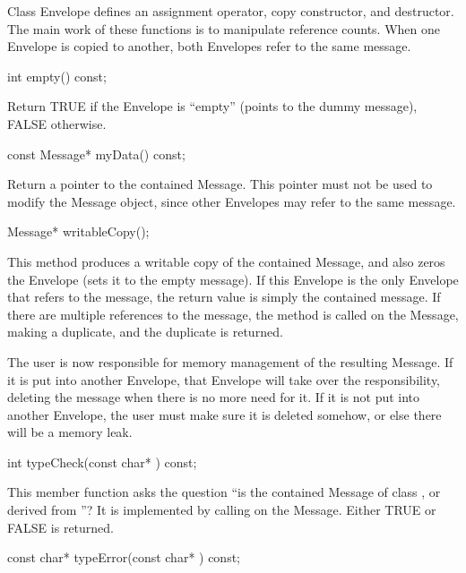 Class Envelope defines an assignment operator, copy constructor, and
destructor.  The main work of these functions is to manipulate reference
counts.  When one Envelope is copied to another, both Envelopes refer
to the same message.

\begin{example}
int empty() const;
\end{example}

Return TRUE if the Envelope is ``empty'' (points to the dummy message),
FALSE otherwise.

\begin{example}
const Message* myData() const;
\end{example}

Return a pointer to the contained Message.  This pointer must not be
used to modify the Message object, since other Envelopes may refer to
the same message.

\begin{example}
Message* writableCopy();
\end{example}

This method produces a writable copy of the contained Message, and
also zeros the Envelope (sets it to the empty message).  If this
Envelope is the only Envelope that refers to the message, the
return value is simply the contained message.  If there are multiple
references to the message, the  method is called on the
Message, making a duplicate, and the duplicate is returned.

The user is now responsible for memory management of the resulting
Message.  If it is put into another Envelope, that Envelope will
take over the responsibility, deleting the message when there is
no more need for it.  If it is not put into another Envelope, the
user must make sure it is deleted somehow, or else there will be
a memory leak.

\begin{example}
int typeCheck(const char* ) const;
\end{example}

This member function asks the question ``is the contained Message
of class , or derived from ''?  It is implemented by
calling  on the Message.  Either TRUE or FALSE is returned.

\begin{example}
const char* typeError(const char* ) const;
\end{example}

